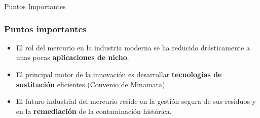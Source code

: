 \begin{frame}{Puntos Importantes}
  \frametitle{Puntos importantes}
  \begin{itemize}[<+->]
    \item El rol del mercurio en la industria moderna se ha reducido drásticamente a unas pocas \textbf{aplicaciones de nicho}.
    \item El principal motor de la innovación es desarrollar \textbf{tecnologías de sustitución} eficientes (Convenio de Minamata).
    \item El futuro industrial del mercurio reside en la gestión segura de sus residuos y en la \textbf{remediación} de la contaminación histórica.
  \end{itemize}
\end{frame}